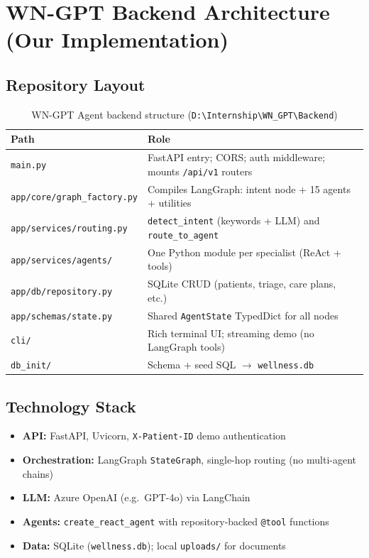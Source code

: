 \documentclass[12pt,a4paper]{article}
\begin{document}
\newpage

\section{WN-GPT Backend Architecture (Our Implementation)}

\subsection{Repository Layout}

\begin{table}[H]
\centering
\renewcommand{\arraystretch}{1.3}
\begin{tabularx}{\textwidth}{lX}
\toprule
\textbf{Path} & \textbf{Role} \\
\midrule
\texttt{main.py} & FastAPI entry; CORS; auth middleware; mounts \texttt{/api/v1} routers \\
\texttt{app/core/graph\_factory.py} & Compiles LangGraph: intent node + 15 agents + utilities \\
\texttt{app/services/routing.py} & \texttt{detect\_intent} (keywords + LLM) and \texttt{route\_to\_agent} \\
\texttt{app/services/agents/} & One Python module per specialist (ReAct + tools) \\
\texttt{app/db/repository.py} & SQLite CRUD (patients, triage, care plans, etc.) \\
\texttt{app/schemas/state.py} & Shared \texttt{AgentState} TypedDict for all nodes \\
\texttt{cli/} & Rich terminal UI; streaming demo (no LangGraph tools) \\
\texttt{db\_init/} & Schema + seed SQL $\rightarrow$ \texttt{wellness.db} \\
\bottomrule
\end{tabularx}
\caption{WN-GPT Agent backend structure (\texttt{D:\textbackslash Internship\textbackslash WN\_GPT\textbackslash Backend})}
\end{table}

\subsection{Technology Stack}

\begin{itemize}[noitemsep]
    \item \textbf{API:} FastAPI, Uvicorn, \texttt{X-Patient-ID} demo authentication
    \item \textbf{Orchestration:} LangGraph \texttt{StateGraph}, single-hop routing (no multi-agent chains)
    \item \textbf{LLM:} Azure OpenAI (e.g.\ GPT-4o) via LangChain
    \item \textbf{Agents:} \texttt{create\_react\_agent} with repository-backed \texttt{@tool} functions
    \item \textbf{Data:} SQLite (\texttt{wellness.db}); local \texttt{uploads/} for documents
\end{itemize}
\end{document}
